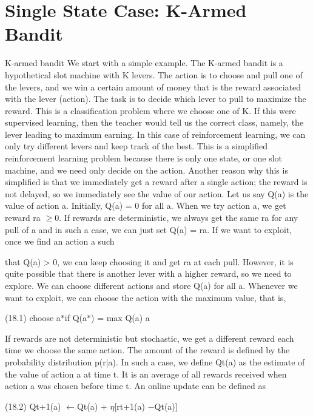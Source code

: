 \section{Single State Case: K-Armed Bandit}

K-armed bandit We start with a simple example. The K-armed bandit is a hypothetical slot machine with K levers. The action is to choose and pull one of the levers, and we win a certain amount of money that is the reward associated with the lever (action). The task is to decide which lever to pull to maximize the reward. This is a classification problem where we choose one of K. If this were supervised learning, then the teacher would tell us the correct class, namely, the lever leading to maximum earning. In this case of reinforcement learning, we can only try different levers and keep track of the best. This is a simplified reinforcement learning problem because there is only one state, or one slot machine, and we need only decide on the action. Another reason why this is simplified is that we immediately get a reward after a single action; the reward is not delayed, so we immediately see the value of our action. Let us say Q(a) is the value of action a. Initially, Q(a) = 0 for all a. When we try action a, we get reward ra $\geq$0. If rewards are deterministic, we always get the same ra for any pull of a and in such a case, we can just set Q(a) = ra. If we want to exploit, once we find an action a such

that Q(a) > 0, we can keep choosing it and get ra at each pull. However, it is quite possible that there is another lever with a higher reward, so we need to explore. We can choose different actions and store Q(a) for all a. Whenever we want to exploit, we can choose the action with the maximum value, that is,

(18.1) choose a$*$if Q(a$*$) = max Q(a) a

If rewards are not deterministic but stochastic, we get a different reward each time we choose the same action. The amount of the reward is defined by the probability distribution p(r|a). In such a case, we define Qt(a) as the estimate of the value of action a at time t. It is an average of all rewards received when action a was chosen before time t. An online update can be defined as

(18.2) Qt+1(a) $\leftarrow$Qt(a) + $\eta$[rt+1(a) $-$Qt(a)]

